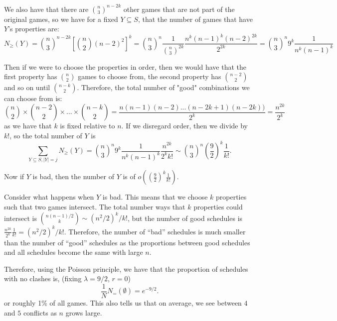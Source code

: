 \documentclass[]{article}
\theoremstyle{definition}
\numberwithin{theorem}{section}
\numberwithin{equation}{section}
\begin{document}
We also have that there are $\binom{n}{3}^{n - 2k}$ other games that are not part of the original games, so we have for a fixed $Y \subseteq S$, that the number of games that have $Y$'s properties are:
\begin{equation}
	N_\geq(Y) = \binom{n}{3}^{n - 2k} \left[ \binom{n}{2} (n - 2)^2 \right]^k = \binom{n}{3}^n \frac{1}{\binom{n}{3}^{2k}} \frac{n^{k} (n - 1)^{k} (n - 2)^{2k}}{2^{2k}} = \binom{n}{3}^n 9^{k} \frac{1}{n^k(n-1)^k}
\end{equation}


Then if we were to choose the properties in order, then we would have that the first property has $\binom{n}{2}$ games to choose from, the second property has $\binom{n-2}{2}$ and so on until $\binom{n-k}{2}$. Therefore, the total number of "good" combinations we can choose from is:
\begin{equation}
	\binom{n}{2} \times \binom{n-2}{2} \times ... \times \binom{n - k}{2} = \frac{n(n -1) (n - 2) ... (n - 2k + 1)(n - 2k))}{2^k} = \frac{n^{2k}}{2^k}
\end{equation}
as we have that $k$ is fixed relative to $n$. 
If we disregard order, then we divide by $k!$, so the total number of $Y$ is
\begin{equation}
	\sum_{Y \subseteq S, |Y| = j} N_\geq(Y) = \binom{n}{3}^n 9^{k} \frac{1}{n^k(n-1)^k}\frac{n^{2k}}{2^k k!} \sim \binom{n}{3}^n \left(\frac{9}{2}\right)^k \frac{1}{k!}.
\end{equation}

Now if $Y$ is bad, then the number of $Y$ is of $o(\left(\frac{9}{2}\right)^k \frac{1}{k!})$.

Consider what happens when $Y$ is bad. This means that we choose $k$ properties such that two games intersect. The total number ways that $k$ properties could intersect is $\binom{n(n - 1)/2}{k} \sim (n^2/2)^k/k!$, but the number of good schedules is $\frac{n^{2k}}{2^k}\frac{1}{k!} = (n^2/2)^k/ k!$. Therefore, the number of ``bad'' schedules is much smaller than the number of ``good''  schedules as the proportions between good schedules and all schedules become the same with large $n$. 

Therefore, using the Poisson principle, we have that the proportion of schedules with no clashes is, (fixing $\lambda = 9/2$, $r = 0$)
\begin{equation}
	\frac{1}{N} N_=(\emptyset) = e^{-9/2}.
\end{equation}
or roughly 1\% of all games.
This also tells us that on average, we see between $4$ and $5$ conflicts as $n$ grows large. 
\end{document}
